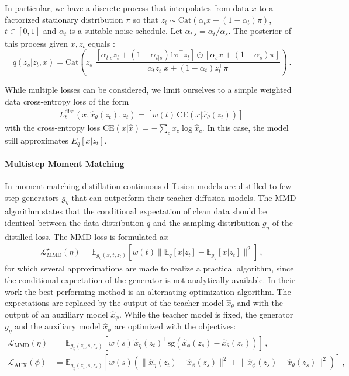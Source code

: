 In particular, we have a discrete process that interpolates from data $x$ to a factorized stationary distribution $\pi$ so that $z_t \sim \mathrm{Cat}\left(\alpha_t x + (1 - \alpha_t) \pi\right)$, $t \in [0,1]$ and $\alpha_t$ is a suitable noise schedule. Let $\alpha_{t|s} = \alpha_t / \alpha_s$. The posterior of this process given $x, z_t$ equals \citep{Sahoo2024simpleandeffective}:
\begin{equation}
    q(z_s|z_t,x)=\text{Cat}\left(z_s| \frac{[\alpha_{t|s}z_t+(1-\alpha_{t|s})1\pi^\top z_t]\odot[\alpha_s x+(1-\alpha_s)\pi]}{\alpha_t z_t^\top x+(1-\alpha_t)z_t^\top\pi}\right)\,.
\end{equation}


While multiple losses can be considered, we limit ourselves to a simple weighted data cross-entropy loss of the form
\begin{align}
     L_t^{\mathrm{disc}}(x, \hat{x}_\theta(z_t), z_t) = \left[w(t) \, \mathrm{CE}\left(x| \hat{x}_\theta(z_t)\right) \right]\, \label{eq:discrete_l}
\end{align}
with the cross-entropy loss $\mathrm{CE}(x| \hat{x}) = -\sum_c x_c \log \hat{x}_c$.
In this case, the model still approximates $E_q[x | z_t]$.


\paragraph{Multistep Moment Matching}
In moment matching distillation \citep{salimans2024multistep} continuous diffusion models are distilled to few-step generators $g_\eta$ that can outperform their teacher diffusion models.
The MMD algorithm states that the conditional expectation of clean data should be identical between the data distribution $q$ and the sampling distribution $g_{\eta}$ of the distilled loss.
The MMD loss is formulated as:
\begin{align}
    \mathcal{L}_{\text{MMD}}^\star(\eta) = \mathbb{E}_{g_\eta(x, t, z_t)} \left[w(t) \lVert \mathbb{E}_{q}[x|z_t] - \mathbb{E}_{g_\eta}[x|z_t] \rVert^2 \right]\,, \label{eq:mmd_l_star}
\end{align}
for which several approximations are made to realize a practical algorithm,
since the conditional expectation of the generator is not analytically available.
In their work the best performing method is an alternating optimization algorithm.
The expectations are replaced by the output of the teacher model $\hat{x}_\theta$ and with the output of an auxiliary model $\hat{x}_\phi$. While the teacher model is fixed, the generator $g_\eta$ and the auxiliary model $\hat{x}_\phi$ are optimized with the objectives:
\begin{align}
    \mathcal{L}_{\text{MMD}}(\eta) &= \mathbb{E}_{g_\eta(z_t, s, z_s)}\left[w(s) \, \hat{x}_\eta(z_t)^\top \mathrm{sg}( \hat{x}_\phi(z_s) - \hat{x}_\theta(z_s)) \right]\,, \label{eq:mmd_alternating_1} \\
    \mathcal{L}_\mathrm{AUX}(\phi) &= \mathbb{E}_{g_\eta(z_t, s, z_s)}\left[w(s) \left( \lVert \hat{x}_\eta(z_t) - \hat{x}_\phi(z_s) \rVert^2 + \lVert  \hat{x}_\phi(z_s) - \hat{x}_\theta(z_s) \rVert^2\right)\right]\,,
    \label{eq:mmd_alternating_2}
\end{align}
